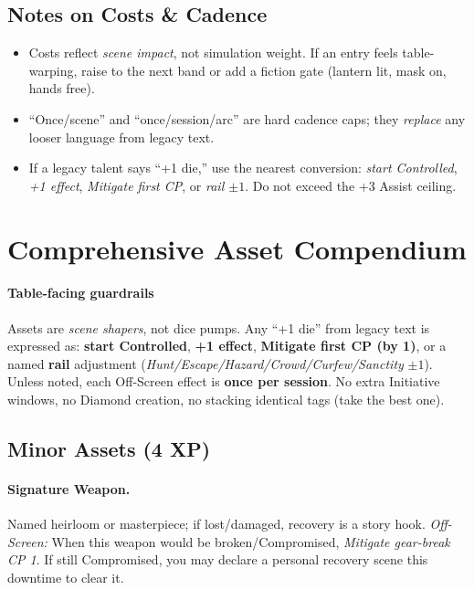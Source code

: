 \documentclass[11pt]{article}
\begin{document}
\subsection*{Notes on Costs \& Cadence}
\begin{itemize}
  \item Costs reflect \emph{scene impact}, not simulation weight. If an entry feels table-warping, raise to the next band or add a fiction gate (lantern lit, mask on, hands free).
  \item “Once/scene” and “once/session/arc” are hard cadence caps; they \emph{replace} any looser language from legacy text.
  \item If a legacy talent says “+1 die,” use the nearest conversion: \emph{start Controlled}, \emph{+1 effect}, \emph{Mitigate first CP}, or \emph{rail $\pm1$}. Do not exceed the +3 Assist ceiling.
\end{itemize}

\section*{Comprehensive Asset Compendium}

\paragraph{Table-facing guardrails}
Assets are \emph{scene shapers}, not dice pumps. Any “+1 die” from legacy text is expressed as: \textbf{start Controlled}, \textbf{+1 effect}, \textbf{Mitigate first CP (by 1)}, or a named \textbf{rail} adjustment (\emph{Hunt/Escape/Hazard/Crowd/Curfew/Sanctity} $\pm 1$). Unless noted, each Off-Screen effect is \textbf{once per session}. No extra Initiative windows, no Diamond creation, no stacking identical tags (take the best one).

\subsection*{Minor Assets (4 XP)}
\paragraph{Signature Weapon.} Named heirloom or masterpiece; if lost/damaged, recovery is a story hook.
\emph{Off-Screen:} When this weapon would be broken/Compromised, \emph{Mitigate gear-break CP 1}. If still Compromised, you may declare a personal recovery scene this downtime to clear it.
\end{document}
